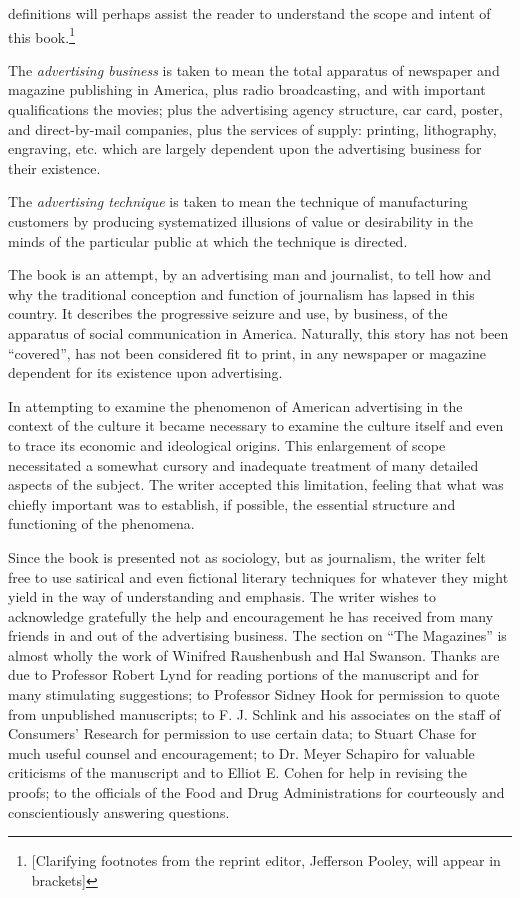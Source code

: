 \documentclass[nohyper,openany,nobib]{tufte-book}
\begin{document}
 definitions will perhaps assist the reader to 
understand the scope and intent of this book.\footnote{[Clarifying footnotes from the reprint editor, Jefferson Pooley, will appear in brackets]} 

The \emph{advertising business} is taken to mean the total apparatus of
newspaper and magazine publishing in America, plus radio broadcasting,
and with important qualifications the movies; plus the advertising
agency structure, car card, poster, and direct-by-mail companies, plus
the services of supply: printing, lithography, engraving, etc. which are
largely dependent upon the advertising business for their existence.

The \emph{advertising technique} is taken to mean the technique of
manufacturing customers by producing systematized illusions of value or
desirability in the minds of the particular public at which the
technique is directed.

The book is an attempt, by an advertising man and journalist, to tell
how and why the traditional conception and function of journalism has
lapsed in this country. It describes the progressive seizure and use, by
business, of the apparatus of social communication in America.
Naturally, this story has not been ``covered'', has not been considered
fit to print, in any newspaper or magazine dependent for its existence
upon advertising.

In attempting to examine the phenomenon of American advertising in the
context of the culture it became necessary to examine the culture itself
and even to trace its economic and ideological origins. This enlargement
of scope necessitated a somewhat cursory and inadequate treatment of
many detailed aspects of the subject. The writer accepted this
limitation, feeling that what was chiefly important was to establish, if
possible, the essential structure and functioning of the phenomena.

Since the book is presented not as sociology, but as journalism, the
writer felt free to use satirical and even fictional literary techniques
for whatever they might yield in the way of understanding and emphasis.
The writer wishes to acknowledge gratefully the help and encouragement
he has received from many friends in and out of the advertising
business. The section on ``The Magazines'' is almost wholly the work of
Winifred Raushenbush and Hal Swanson. Thanks are due to Professor Robert
Lynd for reading portions of the manuscript and for many stimulating
suggestions; to Professor Sidney Hook for permission to quote from
unpublished manuscripts; to F. J. Schlink and his associates on the
staff of Consumers' Research for permission to use certain data; to
Stuart Chase for much useful counsel and encouragement; to Dr. Meyer
Schapiro for valuable criticisms of the manuscript and to Elliot E.
Cohen for help in revising the proofs; to the officials of the Food and
Drug Administrations for courteously and conscientiously answering
questions.
\end{document}
